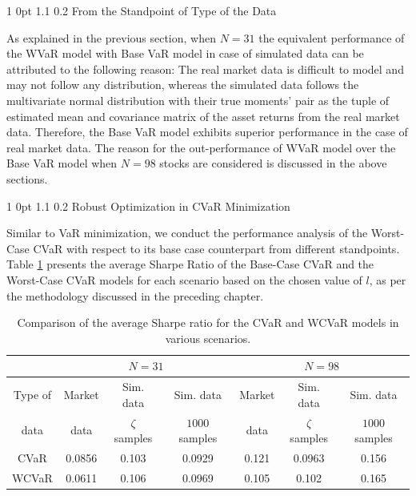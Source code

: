 \documentclass[12pt]{article}
\makeatletter
\numberwithin{equation}{section}
\renewcommand{\subsection}{
  \@startsection
  {subsection}%
  {1}%
  {0pt}%
  {1.1\baselineskip}%
  {0.2\baselineskip}%
  {\sc \centering}%
}
\renewcommand{\subsubsection}{
  \@startsection
  {subsubsection}%
  {1}%
  {0pt}%
  {1.1\baselineskip}%
  {0.2\baselineskip}%
  {\sc \centering}%
}
\makeatother
\begin{document}
\subsubsection{From the Standpoint of Type of the Data}

As explained in the previous section, when $N=31$ the equivalent performance of the WVaR model with Base VaR model in case of simulated data can be attributed to the following reason: The real market data is difficult to model and may not follow any distribution, whereas the simulated data follows the multivariate normal distribution with their true moments' pair as the tuple of estimated mean and covariance matrix of the asset returns from the real market data. Therefore, the Base VaR model exhibits superior performance in the case of real market data. The reason for the out-performance of WVaR model over the Base VaR model when $N=98$ stocks are considered is discussed in the above sections.

\subsection{Robust Optimization in CVaR Minimization}

Similar to VaR minimization, we conduct the performance analysis of the Worst-Case CVaR with respect to its base case counterpart from different standpoints. Table \ref{tab:cvar_conc} presents the average Sharpe Ratio of the Base-Case CVaR and the Worst-Case CVaR models for each scenario based on the chosen value of $l$, as per the methodology discussed in the preceding chapter.

\begin{table}[!h]
  \centering
  \small
    \captionsetup{justification=centering}
  \begin{tabular}{|c|c|c|c|c|c|c|}
    \hline
   \multirow{2}{*}{} $N$ &
      \multicolumn{3}{c|}{$N=31$} &
      \multicolumn{3}{c|}{$N=98$}  \\
    \hline
    Type of & Market & Sim. data & Sim. data & Market & Sim. data & Sim. data \\
    data & data & $\zeta$ samples & $1000$ samples & data & $\zeta$ samples & $1000$ samples \\
    \hline
    CVaR & 0.0856 & 0.103 & 0.0929 & 0.121 & 0.0963 & 0.156 \\
    \hline
    WCVaR & 0.0611 & 0.106 & 0.0969 & 0.105 & 0.102 & 0.165 \\
    \hline
  \end{tabular}
  \caption{Comparison of the average Sharpe ratio for the CVaR and WCVaR models in various scenarios.}
  \label{tab:cvar_conc}
\end{table}
\end{document}
